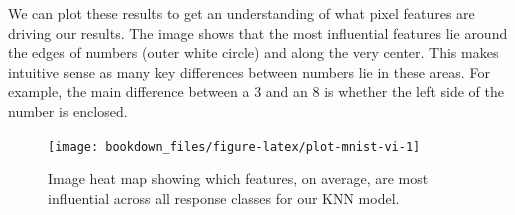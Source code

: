 \documentclass[]{krantz}
\makeatletter
\newenvironment{Shaded}{\begin{snugshade}}{\end{snugshade}}
\newcommand{\CharTok}[1]{\textcolor[rgb]{0.5,0.5,0.5}{#1}}
\newcommand{\CommentTok}[1]{\textcolor[rgb]{0.37,0.37,0.37}{\textit{#1}}}
\newcommand{\DataTypeTok}[1]{\textcolor[rgb]{0.27,0.27,0.27}{#1}}
\newcommand{\DecValTok}[1]{\textcolor[rgb]{0.06,0.06,0.06}{#1}}
\newcommand{\FloatTok}[1]{\textcolor[rgb]{0.06,0.06,0.06}{#1}}
\newcommand{\KeywordTok}[1]{\textcolor[rgb]{0.27,0.27,0.27}{\textbf{#1}}}
\newcommand{\NormalTok}[1]{#1}
\newcommand{\OperatorTok}[1]{\textcolor[rgb]{0.43,0.43,0.43}{\textbf{#1}}}
\newcommand{\StringTok}[1]{\textcolor[rgb]{0.5,0.5,0.5}{#1}}
\newenvironment{kframe}{%
\medskip{}
\setlength{\fboxsep}{.8em}
 \def\at@end@of@kframe{}%
 \ifinner\ifhmode%
  \def\at@end@of@kframe{\end{minipage}}%
  \begin{minipage}{\columnwidth}%
 \fi\fi%
 \def\FrameCommand##1{\hskip\@totalleftmargin \hskip-\fboxsep
 \colorbox{shadecolor}{##1}\hskip-\fboxsep
     \hskip-\linewidth \hskip-\@totalleftmargin \hskip\columnwidth}%
 \MakeFramed {\advance\hsize-\width
   \@totalleftmargin\z@ \linewidth\hsize
   \@setminipage}}%
 {\par\unskip\endMakeFramed%
 \at@end@of@kframe}
\renewenvironment{Shaded}{\begin{kframe}}{\end{kframe}}
\makeatother
\begin{document}
We can plot these results to get an understanding of what pixel features are driving our results. The image shows that the most influential features lie around the edges of numbers (outer white circle) and along the very center. This makes intuitive sense as many key differences between numbers lie in these areas. For example, the main difference between a 3 and an 8 is whether the left side of the number is enclosed.

\begin{Shaded}
\end{Shaded}

\begin{figure}

{\centering \texttt{[image: bookdown\_files/figure-latex/plot-mnist-vi-1]} 

}

\caption{Image heat map showing which features, on average, are most influential across all response classes for our KNN model.}\label{fig:plot-mnist-vi}
\end{figure}
\end{document}
